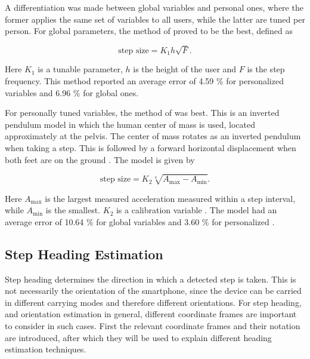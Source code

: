 A differentiation was made between global variables and personal ones, where the former applies the same set of variables to all users, while the latter are tuned per person. For global parameters, the method of \citet{Tian2016} proved to be the best, defined as

\begin{equation}
	\label{eq:Tian2016_sle}
	\text{step size} = K_1 h \sqrt{F}.
\end{equation}

Here $K_1$ is a tunable parameter, $h$ is the height of the user and $F$ is the step frequency. This method reported an average error of  4.59 \% for personalized variables and 6.96 \% for global ones. \par 

For personally tuned variables, the method of \citet{Weinberg2002} was best. This is an inverted pendulum model in which the human center of mass is used, located approximately at the pelvis. The center of mass rotates as an inverted pendulum when taking a step. This is followed by a forward horizontal displacement when both feet are on the ground \cite{Diez2018}. The model is given by

\begin{equation}
\text{step size} =K_2 \sqrt[4]{A_{\max }-A_{\min }}.
\label{eq:weinberg_stepsize}
\end{equation}

Here $A_{\max}$ is the largest measured acceleration measured within a step interval, while $A_{\min}$ is the smallest. $K_2$ is a calibration variable  \cite{Weinberg2002,Diez2018}. The model had an average error of  10.64 \% for global variables and  3.60 \% for personalized \cite{Vezocnik2019}.

\subsection{Step Heading Estimation}
\label{sec:rw-step_heading_estimation}
Step heading determines the direction in which a detected step is taken. This is not necessarily the orientation of the smartphone, since the device can be carried in different carrying modes and therefore different orientations. For step heading, and orientation estimation in general, different coordinate frames are important to consider in such cases. First the relevant coordinate frames and their notation are introduced, after which they will be used to explain different heading estimation techniques. \par 

